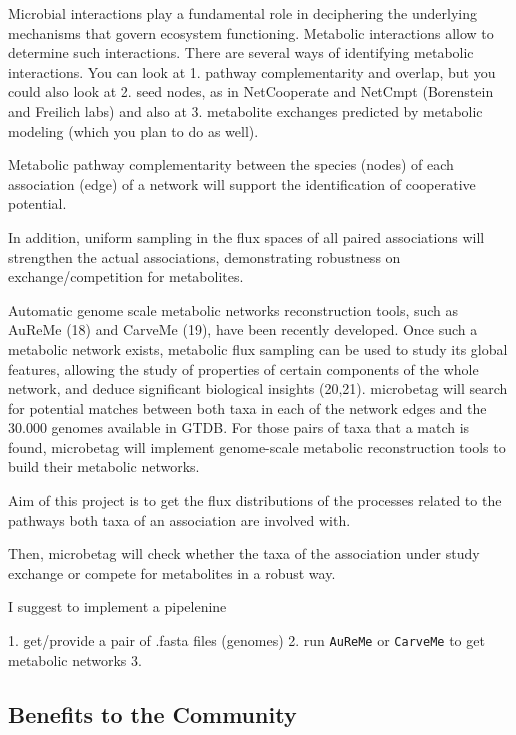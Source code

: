 \documentclass{article}
\begin{document}
Microbial interactions play a fundamental role in deciphering the underlying mechanisms that govern ecosystem functioning.
Metabolic interactions allow to determine such interactions. 
There are several ways of identifying metabolic interactions. 
You can look at 
1. pathway complementarity and overlap, 
but you could also look at 
2. seed nodes, 
as in NetCooperate and NetCmpt (Borenstein and Freilich labs) 
and also at 
3. metabolite exchanges predicted by metabolic modeling 
(which you plan to do as well). 

Metabolic pathway complementarity between the species (nodes) of each association (edge) of a network will support the identification of cooperative potential.



In addition, uniform sampling in the flux spaces of all paired associations will strengthen the actual associations, demonstrating robustness on exchange/competition for metabolites. 


Automatic genome scale metabolic networks reconstruction tools, such as AuReMe (18) and CarveMe (19), have been recently developed. Once such a metabolic network exists, metabolic flux sampling can be used to study its global features, allowing the study of properties of certain components of the whole network, and deduce significant biological insights (20,21).
microbetag will search for potential matches between both taxa in each of the network edges and the 30.000 genomes available in GTDB. For those pairs of taxa that a match is found, microbetag will implement genome-scale metabolic reconstruction tools to build their metabolic networks. 


Aim of this project is to get the flux distributions of the processes related to the pathways both taxa of an association are involved with. 

Then, microbetag will check whether the taxa of the association under study exchange or compete for metabolites in a robust way.






I suggest to implement a pipelenine 

1. get/provide a pair of .fasta files (genomes)
2. run \texttt{AuReMe} or \texttt{CarveMe} to get metabolic networks
3. 




\subsection{Benefits to the Community}
\end{document}
